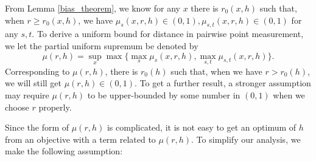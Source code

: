 \documentclass[aos,preprint]{imsart}
\theoremstyle{remark}
\begin{document}
From Lemma \ref{bias_theorem}, we know for any $x$ there is $r_0(x,h)$ such that, when $r\geq r_0(x,h)$, we have $\mu_s(x,r,h)\in (0,1), \mu_{s,t}(x,r,h)\in(0,1)$ for any $s,t$. To derive a uniform bound for distance in pairwise point measurement, we let the partial uniform supremum be denoted by
\[
\mu(r,h) = \sup_x \max\{\max_s \mu_s(x,r,h), \max_{s,t}\mu_{s,t}(x,r,h)\}.
\]
Corresponding to $\mu(r,h)$, there is $r_0(h)$ such that, 
when we have $r>r_0(h)$, we will still get $\mu(r,h)\in(0,1)$. To get a further result, a stronger assumption may require $\mu(r,h)$ to be upper-bounded by some number in $(0,1)$ when we choose $r$ properly.

Since the form of $\mu(r,h)$ is complicated, it is not easy to get an optimum of $h$ from an objective with a term related to $\mu(r,h)$. To simplify our analysis, we make the following assumption:
\end{document}
